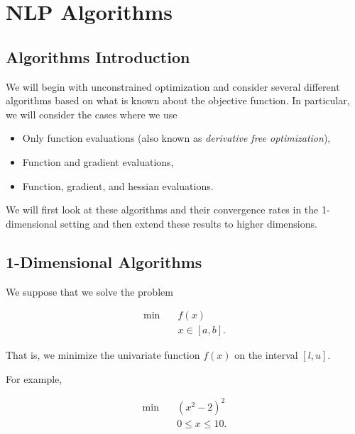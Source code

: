 

%
%
%

\chapter{NLP Algorithms}


\section{Algorithms Introduction}

We will begin with unconstrained optimization and consider several different algorithms based on what is known about the objective function.  In particular, we will consider the cases where we use
\begin{itemize}
\item Only function evaluations (also known as \emph{derivative free optimization}),
\item Function and gradient evaluations,
\item Function, gradient, and hessian evaluations.
\end{itemize}

We will first look at these algorithms and their convergence rates in the 1-dimensional setting and then extend these results to higher dimensions.

\section{1-Dimensional Algorithms}
We suppose that we solve the problem 

\begin{align*}
\min \quad & f(x)\\
& x \in [a,b].
\end{align*}

That is, we minimize the univariate function $f(x)$ on the interval $[l,u]$.  

For example, 

\begin{align*}
\min \quad & (x^2 - 2)^2\\
& 0 \leq x \leq 10.
\end{align*}

